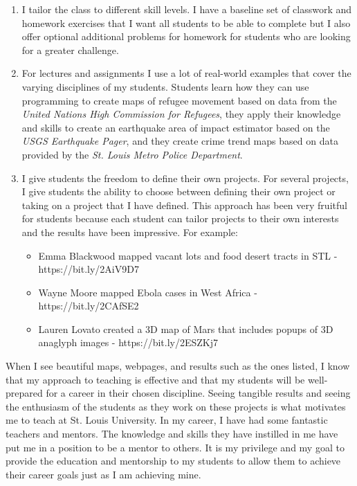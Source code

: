 \documentclass{res}
\begin{document}
\begin{resume}
\begin{enumerate}
\item I tailor the class to different skill levels. I have a baseline set of classwork and homework exercises that I want all students to be able to complete but I also offer optional additional problems for homework for students who are looking for a greater challenge.
\item For lectures and assignments I use a lot of real-world examples that cover the varying disciplines of my students. Students learn how they can use programming to create maps of refugee movement based on data from the \textit{United Nations High Commission for Refugees}, they apply their knowledge and skills to create an earthquake area of impact estimator based on the \textit{USGS Earthquake Pager}, and they create crime trend maps based on data provided by the \textit{St. Louis Metro Police Department}.
\item I give students the freedom to define their own projects. For several projects, I give students the ability to choose between defining their own project or taking on a project that I have defined. This approach has been very fruitful for students because each student can tailor projects to their own interests and the results have been impressive. For example:
\begin{itemize}  
\item Emma Blackwood mapped vacant lots and food desert tracts in STL - 
https://bit.ly/2AiV9D7 
\item Wayne Moore mapped Ebola cases in West Africa - https://bit.ly/2CAfSE2 
\item Lauren Lovato created a 3D map of Mars that includes popups of 3D anaglyph images - https://bit.ly/2ESZKj7
\end{itemize}
\end{enumerate}
\par When I see beautiful maps, webpages, and results such as the ones listed, I know that my approach to teaching is effective and that my students will be well-prepared for a career in their chosen discipline. Seeing tangible results and seeing the enthusiasm of the students as they work on these projects is what motivates me to teach at St. Louis University. In my career, I have had some fantastic teachers and mentors. The knowledge and skills they have instilled in me have put me in a position to be a mentor to others. It is my privilege and my goal to provide the education and mentorship to my students to allow them to achieve their career goals just as I am achieving mine.
 

\end{resume}
\end{document}

